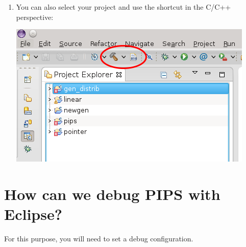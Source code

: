 \documentclass[a4paper]{article}
\begin{document}
\begin{enumerate}
\item You can also select your project and use the shortcut in the C/C++ perspective:
\begin{center}
\noindent
\includegraphics[scale=0.4]{eclipse/06-eclipseJUNO-build2.png}
\end{center}
\end{enumerate}


\section{How can we debug PIPS with Eclipse?}

For this purpose, you will need to set a debug configuration.
\end{document}
